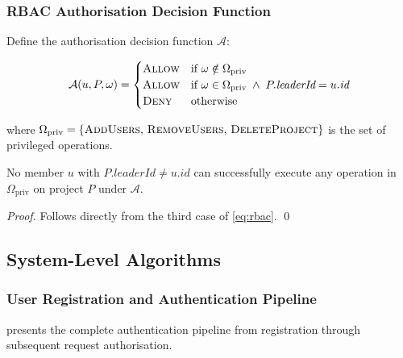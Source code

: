 \subsubsection{RBAC Authorisation Decision Function}

Define the authorisation decision function $\mathcal{A}$:

\begin{equation}
  \mathcal{A}(u, P, \omega) =
  \begin{cases}
    \textsc{Allow} & \text{if } \omega \notin \Omega_{\text{priv}} \\
    \textsc{Allow} & \text{if } \omega \in \Omega_{\text{priv}} \;\land\; P.\textit{leaderId} = u.\textit{id} \\
    \textsc{Deny}  & \text{otherwise}
  \end{cases}
  \label{eq:rbac}
\end{equation}

\noindent where $\Omega_{\text{priv}} = \{\textsc{AddUsers},\, \textsc{RemoveUsers},\,
\textsc{DeleteProject}\}$ is the set of privileged operations.

\begin{corollary}
  \label{cor:priv}
  No member $u$ with $P.\textit{leaderId} \neq u.\textit{id}$ can successfully
  execute any operation in $\Omega_{\text{priv}}$ on project $P$ under
  $\mathcal{A}$.
\end{corollary}

\begin{proof}
  Follows directly from the third case of \cref{eq:rbac}. \qed
\end{proof}

\subsection{System-Level Algorithms}
\label{sub:algorithms}

\subsubsection{User Registration and Authentication Pipeline}

 presents the complete authentication pipeline from
registration through subsequent request authorisation.

